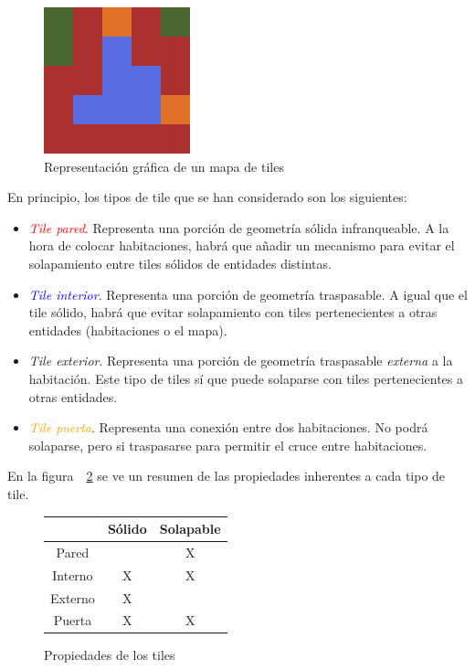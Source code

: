 \begin{figure}[t]
\centering
\includegraphics[scale=1]{img/graftiles}
\caption{Representación gráfica de un mapa de tiles
\label{fig:graftiles}}
\end{figure}

En principio, los tipos de tile que se han considerado son los siguientes:

\begin{itemize}
	\item \textcolor{red}{\emph{Tile pared}}. Representa una porción de geometría sólida infranqueable. A la hora de colocar habitaciones, habrá que añadir un mecanismo para evitar el solapamiento entre tiles sólidos de entidades distintas.
	\item \textcolor{blue}{\emph{Tile interior}}. Representa una porción de geometría traspasable. A igual que el tile sólido, habrá que evitar solapamiento con tiles pertenecientes a otras entidades (habitaciones o el mapa).
	\item \textcolor{OliveGreen}{\emph{Tile exterior}}. Representa una porción de geometría traspasable \emph{externa} a la habitación. Este tipo de tiles sí que puede solaparse con tiles pertenecientes a otras entidades.
	\item \textcolor{orange}{\emph{Tile puerta}}. Representa una conexión entre dos habitaciones. No podrá solaparse, pero si traspasarse para permitir el cruce entre habitaciones.
\end{itemize}

En la figura~~\ref{fig:proptiles} se ve un resumen de las propiedades inherentes a cada tipo de tile.

\begin{figure}[h]
\centering
{
\begin{tabular}{|c|c|c|}
\hline
		& Sólido 		& Solapable 	\\
\hline
Pared 	&  \checkmark  	&  X  			\\ \hline
Interno &  X			&  X  			\\ \hline
Externo &  X  			&  \checkmark  	\\ \hline
Puerta  &  X  			&  X 		 	\\ \hline
\end{tabular}
}
\caption{Propiedades de los tiles
\label{fig:proptiles}
}

\end{figure}



